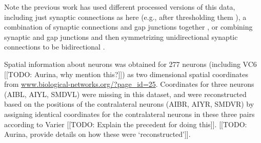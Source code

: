 \documentclass[10pt,letterpaper]{article}
\begin{document}
Note the previous work has used different processed versions of this data, including just synaptic connections as here (e.g., after thresholding them \cite{Kashtan:2004ev}), a combination of synaptic connections and gap junctions together \cite{Azulay:2016cg, Kim:2016gl}, or combining synaptic and gap junctions and then symmetrizing unidirectional synaptic connections to be bidirectional \cite{Towlson:2013gf, Kim:2014bu, Pavlovic:2014gx}.

Spatial information about neurons was obtained for 277 neurons (including VC6 [[TODO: Aurina, why mention this?]]) as two dimensional spatial coordinates from \url{www.biological-networks.org/?page_id=25}.
Coordinates for three neurons (AIBL, AIYL, SMDVL) were missing in this dataset, and were reconstructed based on the positions of the contralateral neurons (AIBR, AIYR, SMDVR) by assigning identical coordinates for the contralateral neurons in these three pairs according to Varier \cite{Varier2011} [[TODO: Explain the precedent for doing this]]. [[TODO: Aurina, provide details on how these were `reconstructed']].

\end{document}
